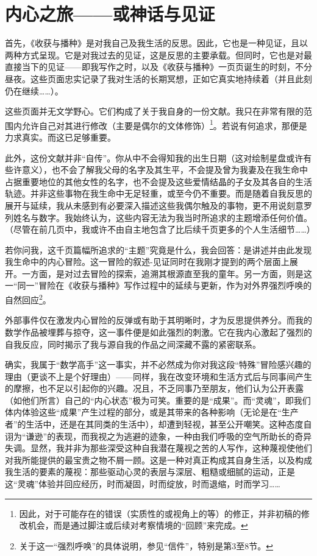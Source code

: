 
\section{内心之旅——或神话与见证}

首先，《收获与播种》是对我自己及我生活的反思。因此，它也是一种见证，且以两种方式呈现。它是对我过去的见证，这是反思的主要承载。但同时，它也是对最直接当下的见证——即我写作之时，以及《收获与播种》一页页诞生的时刻，不分昼夜。这些页面忠实记录了我对生活的长期冥想，正如它真实地持续着（并且此刻仍在继续……）。

这些页面并无文学野心。它们构成了关于我自身的一份文献。我只在非常有限的范围内允许自己对其进行修改（主要是偶尔的文体修饰）\footnote{因此，对于可能存在的错误（实质性的或视角上的等）的修正，并非初稿的修改机会，而是通过脚注或后续对考察情境的“回顾”来完成。}。若说有何追求，那便是力求真实。而这已足够重要。

此外，这份文献并非“自传”。你从中不会得知我的出生日期（这对绘制星盘或许有些许意义），也不会了解我父母的名字及其生平，不会提及曾为我妻及在我生命中占据重要地位的其他女性的名字，也不会提及这些爱情结晶的子女及其各自的生活轨迹。并非这些事物在我生命中无足轻重，或至今仍不重要。而是随着自我反思的展开与延续，我从未感到有必要深入描述这些我偶尔触及的事物，更不用说刻意罗列姓名与数字。我始终认为，这些内容无法为我当时所追求的主题增添任何价值。（尽管在前几页中，我或许不由自主地包含了比后续千页更多的个人生活细节……）

若你问我，这千页篇幅所追求的“主题”究竟是什么，我会回答：是讲述并由此发现我生命中的内心冒险。这一冒险的叙述-见证同时在我刚才提到的两个层面上展开。一方面，是对过去冒险的探索，追溯其根源直至我的童年。另一方面，则是这一“同一”冒险在《收获与播种》写作过程中的延续与更新，作为对外界强烈呼唤的自然回应\footnote{关于这一“强烈呼唤”的具体说明，参见“信件”，特别是第3至8节。}。

外部事件仅在激发内心冒险的反弹或有助于其明晰时，才为反思提供养分。而我的数学作品被埋葬与掠夺，这一事件便是如此强烈的刺激。它在我内心激起了强烈的自我反应，同时揭示了我与源自我的作品之间深藏不露的紧密联系。

确实，我属于“数学高手”这一事实，并不必然成为你对我这段“特殊”冒险感兴趣的理由（更谈不上是个好理由）——同样，我在改变环境和生活方式后与同事间产生的摩擦，也不足以引起你的兴趣。况且，不乏同事乃至朋友，他们认为公开表露（如他们所言）自己的“内心状态”极为可笑。重要的是“成果”。而“灵魂”，即我们体内体验这些“成果”产生过程的部分，或是其带来的各种影响（无论是在“生产者”的生活中，还是在其同类的生活中），却遭到轻视，甚至公开嘲笑。这种态度自诩为“谦逊”的表现，而我视之为逃避的迹象，一种由我们呼吸的空气所助长的奇异失调。显然，我并非为那些深受这种自我潜在蔑视之苦的人写作，这种蔑视使他们对我所能提供的最宝贵之物不屑一顾。这是一种对真正构成其自身生活，以及构成我生活的要素的蔑视：那些驱动心灵的表层与深层、粗糙或细腻的运动，正是这“灵魂”体验并回应经历，时而凝固，时而绽放，时而退缩，时而学习……

